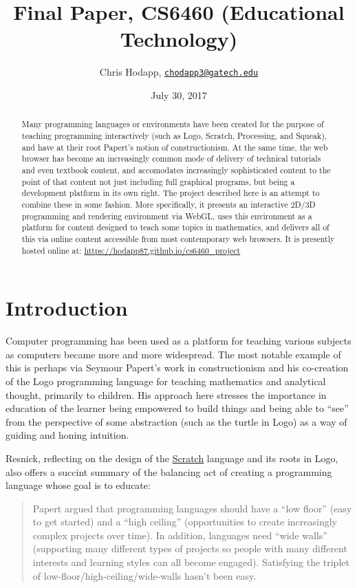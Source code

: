 \documentclass{sig-alternate-05-2015}
\title {Final Paper, CS6460 (Educational Technology)}
\date{July 30, 2017}
\author{Chris Hodapp,
  \href{mailto:chodapp3@gatech.edu}{\nolinkurl{chodapp3@gatech.edu}}}
\begin{document}
\maketitle

\begin{abstract}
  Many programming languages or environments have been created for the
  purpose of teaching programming interactively (such as Logo,
  Scratch, Processing, and Squeak), and have at their root Papert's
  notion of constructionism.  At the same time, the web browser has
  become an increasingly common mode of delivery of technical
  tutorials and even textbook content, and accomodates increasingly
  sophisticated content to the point of that content not just
  including full graphical programs, but being a development platform
  in its own right.  The project described here is an attempt to
  combine these in some fashion.  More specifically, it presents an
  interactive 2D/3D programming and rendering environment via WebGL,
  uses this environment as a platform for content designed to teach
  some topics in mathematics, and delivers all of this via online
  content accessible from most contemporary web browsers.  It is
  presently hosted online at:
  \url{https://hodapp87.github.io/cs6460_project}
\end{abstract}

\section{Introduction}

Computer programming has been used as a platform for teaching various
subjects as computers became more and more widespread.  The most
notable example of this is perhaps via Seymour Papert's work in
constructionism and his co-creation of the Logo programming language
for teaching mathematics and analytical thought, primarily to
children\cite{Stager2016,Papert:1993,Papert:1980,Papert1999}.  His
approach here stresses the importance in education of the learner
being empowered to build things and being able to ``see'' from the
perspective of some abstraction (such as the turtle in Logo) as a way
of guiding and honing intuition.

Resnick, reflecting on the design of the
\href{https://scratch.mit.edu/}{Scratch} language and its roots in
Logo, also offers a succint summary \cite{Resnick2009} of the
balancing act of creating a programming language whose goal is to
educate:

\blockquote{Papert argued that programming languages should have a
  ``low floor'' (easy to get started) and a ``high ceiling''
  (opportunities to create increasingly complex projects over
  time). In addition, languages need ``wide walls'' (supporting many
  different types of projects so people with many different interests
  and learning styles can all become engaged). Satisfying the triplet
  of low-floor/high-ceiling/wide-walls hasn't been
  easy.}
\end{document}
